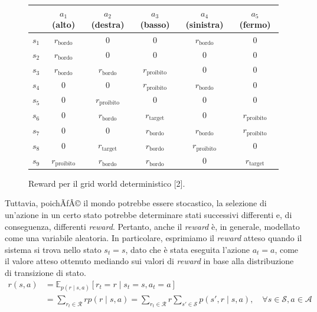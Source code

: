 ﻿\documentclass[11pt, a4paper]{report}
\begin{document}
\begin{figure}[H]
\centering
\begin{tabular}{c|ccccc}
\toprule
& $a_1$ (alto) & $a_2$ (destra) & $a_3$ (basso) & $a_4$ (sinistra) & $a_5$ (fermo) \\ \midrule
$s_1$ & $r_{\text{bordo}}$ & 0 & 0 & $r_{\text{bordo}}$ & 0 \\
$s_2$ & $r_{\text{bordo}}$ & 0 & 0 & 0 & 0 \\
$s_3$ & $r_{\text{bordo}}$ & $r_{\text{bordo}}$ & $r_{\text{proibito}}$ & 0 & 0 \\
$s_4$ & 0 & 0 & $r_{\text{proibito}}$ & $r_{\text{bordo}}$ & 0 \\
$s_5$ & 0 & $r_{\text{proibito}}$ & 0 & 0 & 0 \\
$s_6$ & 0 & $r_{\text{bordo}}$ & $r_{\text{target}}$ & 0 & $r_{\text{proibito}}$ \\
$s_7$ & 0 & 0 & $r_{\text{bordo}}$ & $r_{\text{bordo}}$ & $r_{\text{proibito}}$ \\
$s_8$ & 0 & $r_{\text{target}}$ & $r_{\text{bordo}}$ & $r_{\text{proibito}}$ & 0 \\
$s_9$ & $r_{\text{proibito}}$ & $r_{\text{bordo}}$ & $r_{\text{bordo}}$ & 0 & $r_{\text{target}}$ \\
\bottomrule
\end{tabular}
\caption{Reward per il grid world deterministico [2].}
\end{figure}

Tuttavia, poichÃƒÂ© il mondo potrebbe essere stocastico, la selezione di un'azione in un certo stato potrebbe determinare stati successivi differenti e, di conseguenza, differenti \emph{reward}. Pertanto, anche il \emph{reward} è, in generale, modellato come una variabile aleatoria. In particolare, esprimiamo il \emph{reward} atteso quando il sistema si trova nello stato $s_t = s$, dato che è stata eseguita l'azione $a_t = a$, come il valore atteso ottenuto mediando sui valori di \emph{reward} in base alla distribuzione di transizione di stato.
\begin{equation}
\begin{aligned}
r(s, a) &= \mathbb{E}_{p(r \mid s, a)} [r_t = r \mid s_t = s, a_t = a] \\
&= \sum_{r_t \in \mathcal{R}} r p(r \mid s, a) = \sum_{r_t \in \mathcal{R}} r \sum_{s' \in \mathcal{S}} p(s', r \mid s, a), \quad \forall s \in \mathcal{S}, a \in \mathcal{A}
\end{aligned}
\end{equation}
\end{document}
